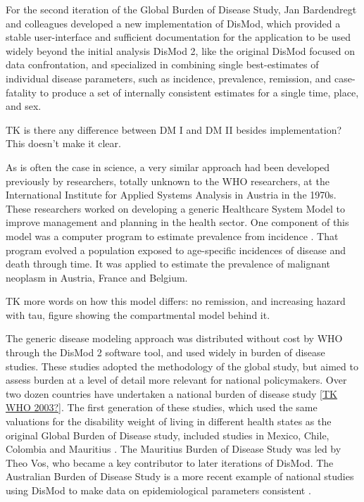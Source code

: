 For the second iteration of the Global Burden of Disease Study, Jan
Bardendregt and colleagues developed a new implementation of DisMod,
which provided a stable user-interface and sufficient documentation
for the application to be used widely beyond the initial analysis
\cite{Barendregt_Generic_2003}\. DisMod 2, like the original DisMod
focused on data confrontation, and specialized in combining single
best-estimates of individual disease parameters, such as incidence,
prevalence, remission, and case-fatality to produce a set of
internally consistent estimates for a single time, place, and sex.

TK is there any difference between DM I and DM II besides
implementation?  This doesn't make it clear.

As is often the case in science, a very similar approach had been
developed previously by researchers, totally unknown to the WHO
researchers, at the International Institute for Applied Systems
Analysis in Austria in the 1970s. These researchers worked on
developing a generic Healthcare System Model to improve management and
planning in the health sector. One component of this model was a
computer program to estimate prevalence from incidence
\cite{Klementiev_On_1977}. That program evolved a population exposed
to age-specific incidences of disease and death through time. It was
applied to estimate the prevalence of malignant neoplasm in Austria,
France and Belgium.

TK more words on how this model differs: no remission, and increasing
hazard with tau, figure showing the compartmental model behind it.

The generic disease modeling approach was distributed without cost by
WHO through the DisMod 2 software tool, and used widely in burden of
disease studies. These studies adopted the methodology of the global
study, but aimed to assess burden at a level of detail more relevant
for national policymakers. Over two dozen countries have undertaken a
national burden of disease study \ref{TK WHO 2003?}. The first
generation of these studies, which used the same valuations for the
disability weight of living in different health states as the original
Global Burden of Disease study, included studies in Mexico, Chile,
Colombia and Mauritius \cite{Lozano_Burden_1995, Concha_Carga_1996,
  Republica_Carga_1994, Vos_Mauritius_1996}. The Mauritius Burden of
Disease Study was led by Theo Vos, who became a key contributor to
later iterations of DisMod. The Australian Burden of Disease Study is
a more recent example of national studies using DisMod to make data on
epidemiological parameters consistent \cite{Lozano_Burden_1995}.

